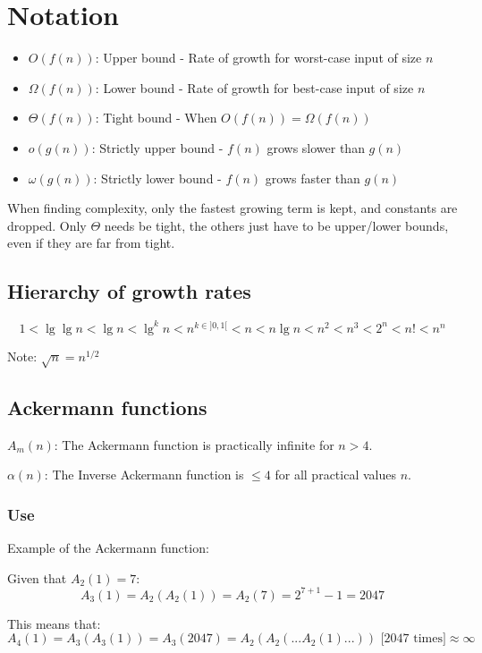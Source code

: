 \section{Notation}

\begin{itemize}
    \item $O(f(n))$: Upper bound - Rate of growth for worst-case input of size $n$
    \item $\Omega(f(n))$: Lower bound - Rate of growth for best-case input of size $n$
    \item $\Theta(f(n))$: Tight bound - When $O(f(n)) = \Omega(f(n))$
    \item $o(g(n))$: Strictly upper bound - $f(n)$ grows slower than $g(n)$
    \item $\omega(g(n))$: Strictly lower bound - $f(n)$ grows faster than $g(n)$ 
\end{itemize}

When finding complexity, only the fastest growing term is kept, and constants are dropped.
Only $\Theta$ needs be tight, the others just have to be upper/lower bounds, even if they are far from tight.


\subsection{Hierarchy of growth rates}

\[
    1 < \lg \lg n < \lg n < \lg^k n < n^{k \in ]0,1[} < n < n \lg n < n^2 < n^3 < 2^n < n! < n^n
\]

Note: $\sqrt{n} = n^{1/2}$

\subsection{Ackermann functions}
\begin{list}{}{}
    \setlength\itemsep{0em}
    \item $A_m(n)$: The Ackermann function is practically infinite for $n > 4$.
    \item $\alpha(n)$: The Inverse Ackermann function is $\leq 4$ for all practical values $n$.
\end{list}

\subsubsection{Use}

Example of the Ackermann function:

Given that $A_2(1)=7$:
\[
    A_3(1) = A_2(A_2(1)) = A_2(7) = 2^{7+1}-1=2047
\]

This means that:
\[
    A_4(1) = A_3(A_3(1)) = A_3(2047) = A_2(A_2(...A_2(1)...)) \text{ [2047 times]} \approx \infty
\]
